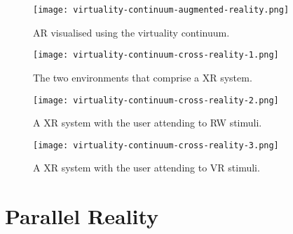 

\begin{figure}[h]
	\begin{center}
		\texttt{[image: virtuality-continuum-augmented-reality.png]}
		\caption{AR visualised using the virtuality continuum.}
		\label{virtuality-continuum-augmented-reality}
	\end{center}
\end{figure}

\begin{figure}[h]
	\begin{center}
		\texttt{[image: virtuality-continuum-cross-reality-1.png]}
		\caption{The two environments that comprise a XR system.}
		\label{virtuality-continuum-cross-reality-1}
	\end{center}
\end{figure}

\begin{figure}[h]
	\begin{center}
		\texttt{[image: virtuality-continuum-cross-reality-2.png]}
		\caption{A XR system with the user attending to RW stimuli.}
		\label{virtuality-continuum-cross-reality-2}
	\end{center}
\end{figure}

\begin{figure}[h]
	\begin{center}
		\texttt{[image: virtuality-continuum-cross-reality-3.png]}
		\caption{A XR system with the user attending to VR stimuli.}
		\label{virtuality-continuum-cross-reality-3}
	\end{center}
\end{figure}

\section{Parallel Reality}

